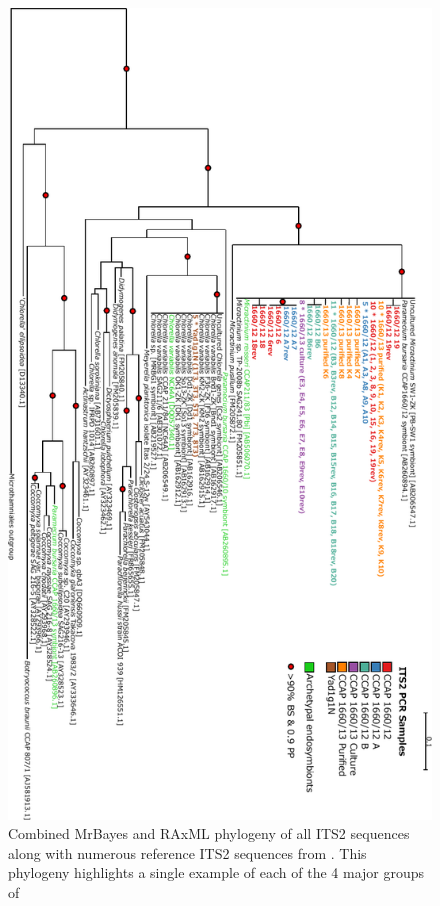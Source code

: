 \begin{figure}
    \includegraphics[height=0.75\textheight]{its_phylo.pdf}
    \caption[ITS2 phylogeny]{Combined MrBayes and RAxML phylogeny of all ITS2 sequences
    along with numerous reference ITS2 sequences from \citep{Hoshina2010,Hoshina2013}.
    This phylogeny highlights a single example of each of the 4 major groups of 
}
\end{figure}
